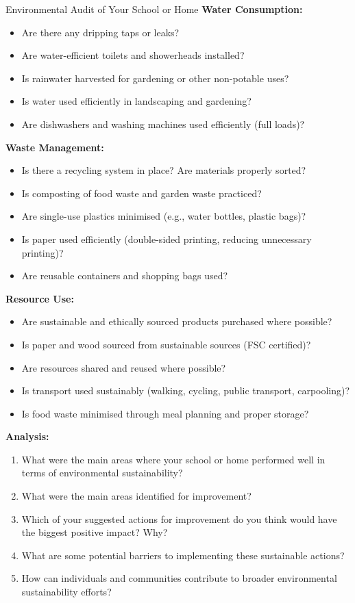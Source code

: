 \begin{investigation}{Environmental Audit of Your School or Home}
\textbf{Water Consumption:}
\begin{itemize}
    \item Are there any dripping taps or leaks?
    \item Are water-efficient toilets and showerheads installed?
    \item Is rainwater harvested for gardening or other non-potable uses?
    \item Is water used efficiently in landscaping and gardening?
    \item Are dishwashers and washing machines used efficiently (full loads)?
\end{itemize}

\textbf{Waste Management:}
\begin{itemize}
    \item Is there a recycling system in place? Are materials properly sorted?
    \item Is composting of food waste and garden waste practiced?
    \item Are single-use plastics minimised (e.g., water bottles, plastic bags)?
    \item Is paper used efficiently (double-sided printing, reducing unnecessary printing)?
    \item Are reusable containers and shopping bags used?
\end{itemize}

\textbf{Resource Use:}
\begin{itemize}
    \item Are sustainable and ethically sourced products purchased where possible?
    \item Is paper and wood sourced from sustainable sources (FSC certified)?
    \item Are resources shared and reused where possible?
    \item Is transport used sustainably (walking, cycling, public transport, carpooling)?
    \item Is food waste minimised through meal planning and proper storage?
\end{itemize}

\textbf{Analysis:}
\begin{enumerate}
    \item What were the main areas where your school or home performed well in terms of environmental sustainability?
    \item What were the main areas identified for improvement?
    \item Which of your suggested actions for improvement do you think would have the biggest positive impact? Why?
    \item What are some potential barriers to implementing these sustainable actions?
    \item How can individuals and communities contribute to broader environmental sustainability efforts?
\end{enumerate}


\end{investigation}
